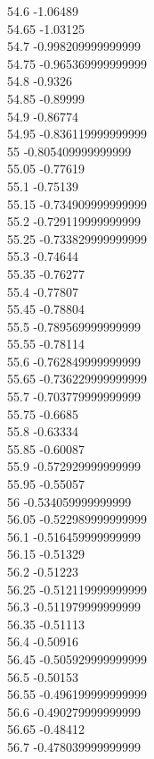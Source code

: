 {54.6	-1.06489\\
54.65	-1.03125\\
54.7	-0.998209999999999\\
54.75	-0.965369999999999\\
54.8	-0.9326\\
54.85	-0.89999\\
54.9	-0.86774\\
54.95	-0.836119999999999\\
55	-0.805409999999999\\
55.05	-0.77619\\
55.1	-0.75139\\
55.15	-0.734909999999999\\
55.2	-0.729119999999999\\
55.25	-0.733829999999999\\
55.3	-0.74644\\
55.35	-0.76277\\
55.4	-0.77807\\
55.45	-0.78804\\
55.5	-0.789569999999999\\
55.55	-0.78114\\
55.6	-0.762849999999999\\
55.65	-0.736229999999999\\
55.7	-0.703779999999999\\
55.75	-0.6685\\
55.8	-0.63334\\
55.85	-0.60087\\
55.9	-0.572929999999999\\
55.95	-0.55057\\
56	-0.534059999999999\\
56.05	-0.522989999999999\\
56.1	-0.516459999999999\\
56.15	-0.51329\\
56.2	-0.51223\\
56.25	-0.512119999999999\\
56.3	-0.511979999999999\\
56.35	-0.51113\\
56.4	-0.50916\\
56.45	-0.505929999999999\\
56.5	-0.50153\\
56.55	-0.496199999999999\\
56.6	-0.490279999999999\\
56.65	-0.48412\\
56.7	-0.478039999999999\\
}
